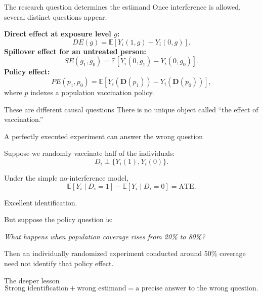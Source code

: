 \documentclass[aspectratio=169,11pt]{beamer}
\newcommand{\E}{\mathbb{E}}
\newcommand{\ATE}{\mathrm{ATE}}
\begin{document}
\begin{frame}{The research question determines the estimand}
Once interference is allowed, several distinct questions appear.

\textbf{Direct effect at exposure level $g$:}
\[
DE(g) = \E[Y_i(1,g)-Y_i(0,g)].
\]
\textbf{Spillover effect for an untreated person:}
\[
SE(g_1,g_0) = \E[Y_i(0,g_1)-Y_i(0,g_0)].
\]
\textbf{Policy effect:}
\[
PE(p_1,p_0) = \E[Y_i(\bm D(p_1))-Y_i(\bm D(p_0))],
\]
where $p$ indexes a population vaccination policy.

\begin{alertblock}{These are different causal questions}
There is no unique object called ``the effect of vaccination.''
\end{alertblock}
\end{frame}

\begin{frame}{A perfectly executed experiment can answer the wrong question}

Suppose we randomly vaccinate half of the individuals:
\[
D_i\perp \{Y_i(1),Y_i(0)\}.
\]

Under the simple no-interference model,
\[
\E[Y_i\mid D_i=1]
-
\E[Y_i\mid D_i=0]
=
\ATE.
\]

Excellent identification.

\vspace{0.3em}

\pause

But suppose the policy question is:

\begin{center}
\textit{What happens when population coverage rises from 20\% to 80\%?}
\end{center}

Then an individually randomized experiment conducted around 50\% coverage
need not identify that policy effect.

\vspace{0.4em}

\begin{alertblock}{The deeper lesson}
\[
\boxed{
\text{Strong identification}
+
\text{wrong estimand}
=
\text{a precise answer to the wrong question}.
}
\]
\end{alertblock}

\end{frame}
\end{document}

